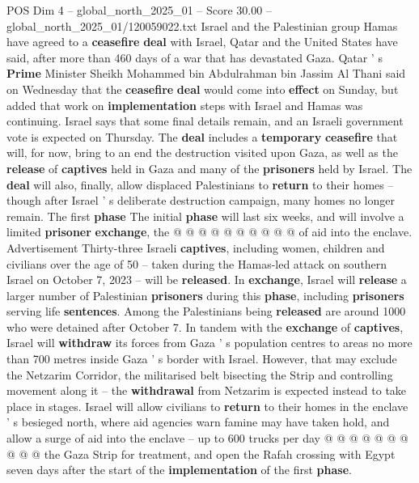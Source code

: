 \begin{textsample}{POS Dim 4 – global\_north\_2025\_01 – Score 30.00 – global\_north\_2025\_01/120059022.txt}  \label{ex:f4_pos_049}
Israel and the Palestinian group Hamas have agreed to a \textbf{ceasefire} \textbf{deal} with Israel, Qatar and the United States have said, after more than 460 days of a war that has devastated Gaza.
Qatar ' s \textbf{Prime} Minister Sheikh Mohammed bin Abdulrahman bin Jassim Al Thani said on Wednesday that the \textbf{ceasefire} \textbf{deal} would come into \textbf{effect} on Sunday, but added that work on \textbf{implementation} steps with Israel and Hamas was continuing.
Israel says that some final details remain, and an Israeli government vote is expected on Thursday.
The \textbf{deal} includes a \textbf{temporary} \textbf{ceasefire} that will, for now, bring to an end the destruction visited upon Gaza, as well as the \textbf{release} of \textbf{captives} held in Gaza and many of the \textbf{prisoners} held by Israel.
The \textbf{deal} will also, finally, allow displaced Palestinians to \textbf{return} to their homes -- though after Israel ' s deliberate destruction campaign, many homes no longer remain.
The first \textbf{phase} The initial \textbf{phase} will last six weeks, and will involve a limited \textbf{prisoner} \textbf{exchange}, the @ @ @ @ @ @ @ @ @ @ of aid into the enclave.
Advertisement Thirty-three Israeli \textbf{captives}, including women, children and civilians over the age of 50 -- taken during the Hamas-led attack on southern Israel on October 7, 2023 -- will be \textbf{released}.
In \textbf{exchange}, Israel will \textbf{release} a larger number of Palestinian \textbf{prisoners} during this \textbf{phase}, including \textbf{prisoners} serving life \textbf{sentences}.
Among the Palestinians being \textbf{released} are around 1000 who were detained after October 7.
In tandem with the \textbf{exchange} of \textbf{captives}, Israel will \textbf{withdraw} its forces from Gaza ' s population centres to areas no more than 700 metres inside Gaza ' s border with Israel.
However, that may exclude the Netzarim Corridor, the militarised belt bisecting the Strip and controlling movement along it -- the \textbf{withdrawal} from Netzarim is expected instead to take place in stages.
Israel will allow civilians to \textbf{return} to their homes in the enclave ' s besieged north, where aid agencies warn famine may have taken hold, and allow a surge of aid into the enclave -- up to 600 trucks per day @ @ @ @ @ @ @ @ @ @ the Gaza Strip for treatment, and open the Rafah crossing with Egypt seven days after the start of the \textbf{implementation} of the first \textbf{phase}.

\end{textsample}
